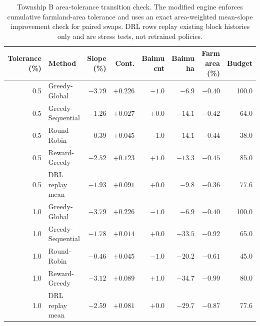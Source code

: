 \begin{table}[htbp]
\centering
\caption{Township B area-tolerance transition check. The modified engine enforces cumulative farmland-area tolerance and uses an exact area-weighted mean-slope improvement check for paired swaps. DRL rows replay existing block histories only and are stress tests, not retrained policies.}
\label{tab:area_tolerance_check}
\begin{tabular}{rlrrrrrr}
\toprule
Tolerance (\%) & Method & Slope (\%) & Cont. & Baimu cnt & Baimu ha & Farm area (\%) & Budget \\
\midrule
0.5 & Greedy-Global & $-3.79$ & $+0.226$ & $-1.0$ & $-6.9$ & $-0.40$ & 100.0 \\
0.5 & Greedy-Sequential & $-1.26$ & $+0.027$ & $+0.0$ & $-14.1$ & $-0.42$ & 64.0 \\
0.5 & Round-Robin & $-0.39$ & $+0.045$ & $-1.0$ & $-14.1$ & $-0.44$ & 38.0 \\
0.5 & Reward-Greedy & $-2.52$ & $+0.123$ & $+1.0$ & $-13.3$ & $-0.45$ & 85.0 \\
0.5 & DRL replay mean & $-1.93$ & $+0.091$ & $+0.0$ & $-9.8$ & $-0.36$ & 77.6 \\
1.0 & Greedy-Global & $-3.79$ & $+0.226$ & $-1.0$ & $-6.9$ & $-0.40$ & 100.0 \\
1.0 & Greedy-Sequential & $-1.78$ & $+0.014$ & $+0.0$ & $-33.5$ & $-0.92$ & 65.0 \\
1.0 & Round-Robin & $-0.46$ & $+0.045$ & $-1.0$ & $-20.2$ & $-0.61$ & 45.0 \\
1.0 & Reward-Greedy & $-3.12$ & $+0.089$ & $+1.0$ & $-34.7$ & $-0.99$ & 80.0 \\
1.0 & DRL replay mean & $-2.59$ & $+0.081$ & $+0.0$ & $-29.7$ & $-0.87$ & 77.6 \\
\bottomrule
\end{tabular}
\end{table}
